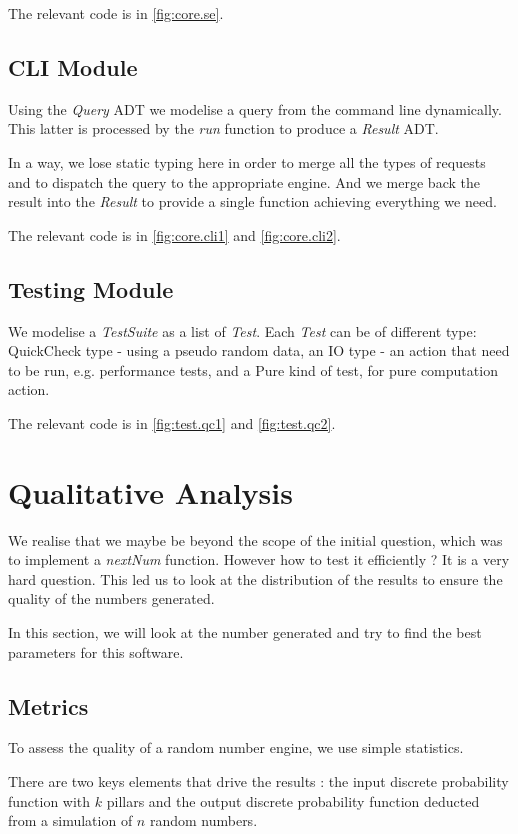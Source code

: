 \documentclass[12pt,a4paper,article]{memoir} %
\begin{document}
The relevant code is in \autoref{fig:core.se}.
\subsection{CLI Module}
Using the \emph{Query} ADT we modelise a query from the command line
dynamically. This latter is processed by the \emph{run} function to 
produce a  \emph{Result} ADT.

In a way, we lose static typing here in order to merge all the types of 
requests and to dispatch the query to the appropriate engine. And we merge
back the result into the \emph{Result} to provide a single function achieving
everything we need.

The relevant code is in \autoref{fig:core.cli1} and \autoref{fig:core.cli2}.
\subsection{Testing Module}
We modelise a \emph{TestSuite} as a list of \emph{Test}.
Each \emph{Test} can be of different type: QuickCheck type - 
using a pseudo random data, 
an IO type - an action that need to be run, e.g. performance tests, 
and a Pure kind of test, for pure computation action.

The relevant code is in \autoref{fig:test.qc1} and \autoref{fig:test.qc2}.
\section{Qualitative Analysis}
\label{sec:quality}
We realise that we maybe be beyond the scope of the initial
question, which was to implement a \emph{nextNum} function.
However how to test it efficiently ? It is a very hard question.
This led us to look at the distribution of the results to ensure
the quality of the numbers generated.

In this section, we will look at the number generated and try
to find the best parameters for this software.

\subsection{Metrics}
To assess the quality of a random number engine, we use
simple statistics. 

There are two keys elements that drive the results :
the input discrete probability function with $k$ pillars and
the output discrete probability function deducted from a
simulation of $n$ random numbers.
\end{document}
